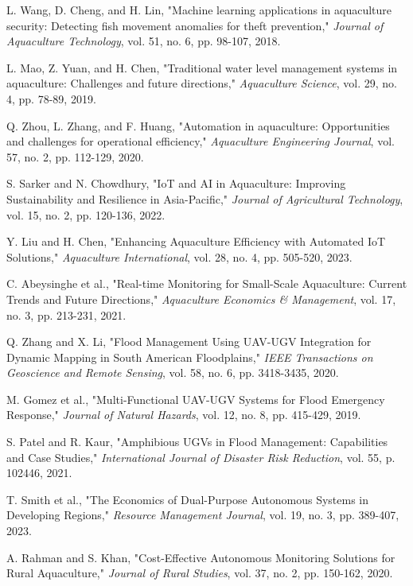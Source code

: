 \documentclass[conference]{IEEEtran}
\begin{document}
\begin{thebibliography}{99}
 L. Wang, D. Cheng, and H. Lin, "Machine learning applications in aquaculture security: Detecting fish movement anomalies for theft prevention," \textit{Journal of Aquaculture Technology}, vol. 51, no. 6, pp. 98-107, 2018.

 L. Mao, Z. Yuan, and H. Chen, "Traditional water level management systems in aquaculture: Challenges and future directions," \textit{Aquaculture Science}, vol. 29, no. 4, pp. 78-89, 2019.

 Q. Zhou, L. Zhang, and F. Huang, "Automation in aquaculture: Opportunities and challenges for operational efficiency," \textit{Aquaculture Engineering Journal}, vol. 57, no. 2, pp. 112-129, 2020.

 S. Sarker and N. Chowdhury, "IoT and AI in Aquaculture: Improving Sustainability and Resilience in Asia-Pacific," \textit{Journal of Agricultural Technology}, vol. 15, no. 2, pp. 120-136, 2022.

 Y. Liu and H. Chen, "Enhancing Aquaculture Efficiency with Automated IoT Solutions," \textit{Aquaculture International}, vol. 28, no. 4, pp. 505-520, 2023.

 C. Abeysinghe et al., "Real-time Monitoring for Small-Scale Aquaculture: Current Trends and Future Directions," \textit{Aquaculture Economics \& Management}, vol. 17, no. 3, pp. 213-231, 2021.

 Q. Zhang and X. Li, "Flood Management Using UAV-UGV Integration for Dynamic Mapping in South American Floodplains," \textit{IEEE Transactions on Geoscience and Remote Sensing}, vol. 58, no. 6, pp. 3418-3435, 2020.

 M. Gomez et al., "Multi-Functional UAV-UGV Systems for Flood Emergency Response," \textit{Journal of Natural Hazards}, vol. 12, no. 8, pp. 415-429, 2019.

 S. Patel and R. Kaur, "Amphibious UGVs in Flood Management: Capabilities and Case Studies," \textit{International Journal of Disaster Risk Reduction}, vol. 55, p. 102446, 2021.

 T. Smith et al., "The Economics of Dual-Purpose Autonomous Systems in Developing Regions," \textit{Resource Management Journal}, vol. 19, no. 3, pp. 389-407, 2023.

 A. Rahman and S. Khan, "Cost-Effective Autonomous Monitoring Solutions for Rural Aquaculture," \textit{Journal of Rural Studies}, vol. 37, no. 2, pp. 150-162, 2020.


\end{thebibliography}
\end{document}
